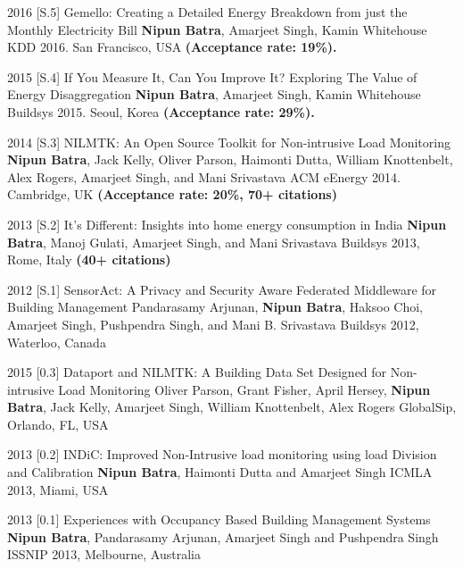 \begin{cvpubl}
	\cvpublentry
	{2016}
	{[S.5]}
	{Gemello: Creating a Detailed Energy Breakdown from just the Monthly Electricity Bill}
	{\textbf{Nipun Batra},  Amarjeet Singh, Kamin Whitehouse}
	{KDD 2016. San Francisco, USA \textbf{(Acceptance rate: 19\%).}}
	
	
	\cvpublentry
	{2015}
	{[S.4]}
	{If You Measure It, Can You Improve It? Exploring The Value of Energy Disaggregation}
	{\textbf{Nipun Batra},  Amarjeet Singh, Kamin Whitehouse}
	{Buildsys 2015. Seoul, Korea \textbf{(Acceptance rate: 29\%).}}
	
	

	
		\cvpublentry
		{2014}
		{[S.3]}
		{NILMTK: An Open Source Toolkit for Non-intrusive Load Monitoring}
		{\textbf{Nipun Batra}, Jack Kelly, Oliver Parson, Haimonti Dutta, William Knottenbelt, Alex Rogers, Amarjeet Singh, and Mani Srivastava}
		{ACM eEnergy 2014. Cambridge, UK \textbf{(Acceptance rate: 20\%, 70+ citations)}}
		
	\cvpublentry
	{2013}
	{[S.2]}
	{It’s Different: Insights into home energy
		consumption in India}
	{\textbf{Nipun Batra}, Manoj Gulati, Amarjeet Singh, and Mani Srivastava}
	{Buildsys 2013, Rome, Italy \textbf{(40+ citations)}}	
	
		\cvpublentry
		{2012}
		{[S.1]}
		{SensorAct: A Privacy and Security Aware Federated Middleware for Building Management}
		{Pandarasamy Arjunan, \textbf{Nipun Batra}, Haksoo Choi, Amarjeet Singh, Pushpendra Singh, and Mani B. Srivastava}
		{Buildsys 2012, Waterloo, Canada}	
		
\end{cvpubl}

\begin{cvpubl}
		\cvpublentry
		{2015}
		{[0.3]}
		{Dataport and NILMTK: A Building Data Set Designed for Non-intrusive Load Monitoring}
		{Oliver Parson, Grant Fisher, April Hersey, \textbf{Nipun Batra}, Jack Kelly, Amarjeet Singh, William Knottenbelt, Alex Rogers}
		{GlobalSip, Orlando, FL, USA}
	
	
		\cvpublentry
		{2013}
		{[0.2]}
		{INDiC: Improved Non-Intrusive load monitoring using load
			Division and Calibration}
		{\textbf{Nipun Batra}, Haimonti Dutta and Amarjeet Singh}
		{ICMLA 2013, Miami, USA}
		
		\cvpublentry
		{2013}
		{[0.1]}
		{Experiences with Occupancy
			Based Building Management Systems}
		{\textbf{Nipun Batra}, Pandarasamy Arjunan, Amarjeet Singh and Pushpendra Singh}
		{ISSNIP 2013, Melbourne, Australia}
	
	
\end{cvpubl}


